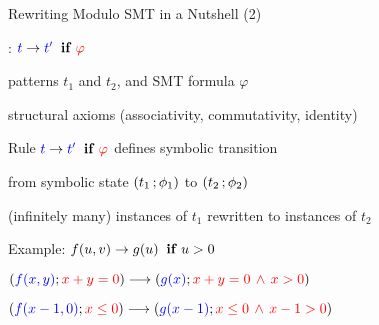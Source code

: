 \documentclass[11pt]{beamer}
\begin{document}
\begin{frame}{Rewriting Modulo SMT in a Nutshell (2)}
\begin{outeritemize}
    \item {}: $\textcolor{blue}{t} \to \textcolor{blue}{t'} \;\;\mbox{\textbf{if}}\; \textcolor{red}{\varphi}$
    
    \begin{inneritemize}
        \item patterns $t_1$ and $t_2$, and SMT formula $\varphi$
        \item structural axioms (associativity, commutativity, identity)
    \end{inneritemize}
    
    \pause
    \item Rule $\textcolor{blue}{t} \to \textcolor{blue}{t'} \;\;\mbox{\textbf{if}}\; \textcolor{red}{\varphi}$ defines \alert{symbolic transition} 
    
    \begin{inneritemize}
        \item from symbolic state $\left( t_1 \,; \phi_1 \right)$ to $\left( t_2 \,; \phi_2 \right)$
        \item (infinitely many) instances of $t_1$ rewritten to instances of $t_2$
    \end{inneritemize}

    \pause
    \item Example:  $f(u,v) \to g(u) \;\;\mbox{\textbf{if}}\; {u > 0}$
    
    \begin{inneritemize}
        \pause
        \item $(\textcolor{blue}{f(x, y)}; \textcolor{red}{x + y = 0}) \longrightarrow (\textcolor{blue}{g(x)}; \textcolor{red}{x + y = 0 \,\wedge\, x > 0}) $
        \pause
        \item $(\textcolor{blue}{f(x - 1, 0)}; \textcolor{red}{x \leq 0}) \longrightarrow (\textcolor{blue}{g(x - 1)}; \textcolor{red}{x \leq 0 \,\wedge\, x - 1 > 0}) $
    \end{inneritemize}
\end{outeritemize}
\end{frame}
\end{document}
